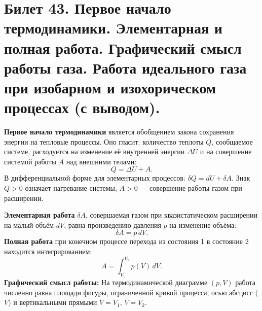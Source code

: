 \section{Билет 43. Первое начало термодинамики. Элементарная и полная работа. Графический смысл работы газа. Работа идеального газа при изобарном и изохорическом процессах (с выводом).}

\begin{definition}
\textbf{Первое начало термодинамики} является обобщением закона сохранения энергии на тепловые процессы. Оно гласит: количество теплоты $Q$, сообщаемое системе, расходуется на изменение её внутренней энергии $\Delta U$ и на совершение системой работы $A$ над внешними телами:
\begin{equation}
    Q = \Delta U + A. \label{eq:first_law_43}
\end{equation}
В дифференциальной форме для элементарных процессов: $\delta Q = dU + \delta A$. Знак $Q>0$ означает нагревание системы, $A>0$ --- совершение работы газом при расширении.
\end{definition}

\begin{definition}
\textbf{Элементарная работа} $\delta A$, совершаемая газом при квазистатическом расширении на малый объём $dV$, равна произведению давления $p$ на изменение объёма:
\begin{equation}
    \delta A = p \, dV. \label{eq:elem_work_43}
\end{equation}
\textbf{Полная работа} при конечном процессе перехода из состояния 1 в состояние 2 находится интегрированием:
\begin{equation}
    A = \int_{V_1}^{V_2} p(V) \, dV. \label{eq:total_work_43}
\end{equation}
\textbf{Графический смысл работы:} На термодинамической диаграмме $(p, V)$ работа численно равна площади фигуры, ограниченной кривой процесса, осью абсцисс ($V$) и вертикальными прямыми $V=V_1$, $V=V_2$.
\end{definition}

